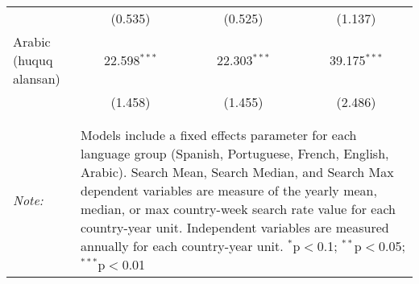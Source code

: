 \begin{table}[!htbp]
\begin{tabular}{@{\extracolsep{5pt}}lccc}
  & (0.535) & (0.525) & (1.137) \\ 
  Arabic (huquq alansan) & 22.598$^{***}$ & 22.303$^{***}$ & 39.175$^{***}$ \\ 
  & (1.458) & (1.455) & (2.486) \\ 
 \hline \\[-1.8ex] 
\hline 
\hline \\[-1.8ex] 
\textit{Note:}  & \multicolumn{3}{l}{\parbox[t]{8cm}{Models include a fixed effects parameter for each language group (Spanish, Portuguese, French, English, Arabic). Search Mean, Search Median, and Search Max dependent variables are measure of the yearly mean, median, or max country-week search rate value for each country-year unit. Independent variables are measured annually for each country-year unit. $^{*}$p$<$0.1; $^{**}$p$<$0.05; $^{***}$p$<$0.01}} \\ 
\end{tabular} 
\end{table} 
